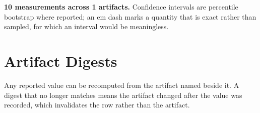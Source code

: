 \documentclass[10pt,journal,compsoc,twocolumn]{IEEEtran}
\begin{document}
\textbf{10 measurements across 1 artifacts.} Confidence intervals are percentile bootstrap where reported; an em dash marks a quantity that is exact rather than sampled, for which an interval would be meaningless.


\section{Artifact Digests}
\begin{table}[htbp]
\centering
{}
\end{table}

Any reported value can be recomputed from the artifact named beside it. A digest that no longer matches means the artifact changed after the value was recorded, which invalidates the row rather than the artifact.


\par\vspace{0.5em}
\balance


\end{document}
